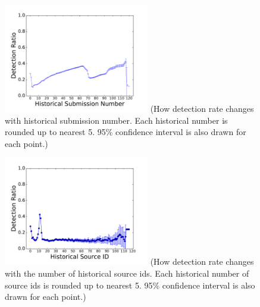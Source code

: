 

\begin{figure}[t!]
\begin{center}
\includegraphics[width=2.5in]{figure/SubNum}
  {\footnotesize{(How detection rate changes with historical submission number. 
Each historical number is rounded up to nearest 5.
95\% confidence interval is also drawn for each point.)}}
\end{center}
\end{figure}

\begin{figure}[t!]
\begin{center}
\includegraphics[width=2.5in]{figure/SubID}
{\footnotesize{(How detection rate changes with the number of historical source ids. 
Each historical number of source ids is rounded up to nearest 5.
95\% confidence interval is also drawn for each point.)}}

\end{center}
\end{figure}

